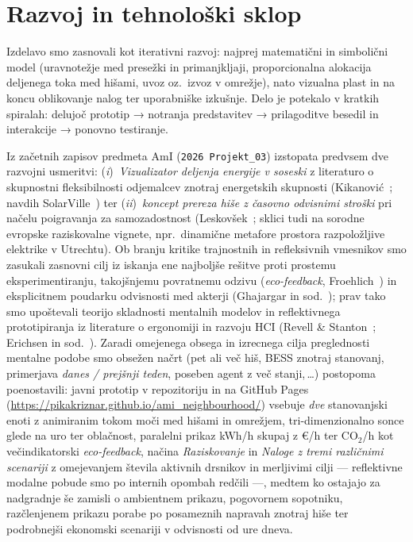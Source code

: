 \documentclass[a4paper,11pt]{article}
\begin{document}
\section*{Razvoj in tehnološki sklop}
Izdelavo smo zasnovali kot iterativni razvoj: najprej matematični in simbolični model (uravnotežje med presežki in primanjkljaji, proporcionalna alokacija deljenega toka med hišami, uvoz oz.\ izvoz v omrežje), nato vizualna plast in na koncu oblikovanje nalog ter uporabniške izkušnje. Delo je potekalo v kratkih spiralah: delujoč prototip → notranja predstavitev → prilagoditve besedil in interakcije → ponovno testiranje.

Iz začetnih zapisov predmeta AmI (\texttt{2026 Projekt\_03}) izstopata predvsem dve razvojni usmeritvi: (\emph{i})~\emph{Vizualizator deljenja energije v soseski} z literaturo o skupnostni fleksibilnosti odjemalcev znotraj energetskih skupnosti (Kikanović~\cite{kikanovic2021}; navdih SolarVille~\cite{solarville}) ter (\emph{ii})~\emph{koncept prereza hiše z časovno odvisnimi stroški} pri načelu poigravanja za samozadostnost (Leskovšek~\cite{leskovsek2022}; sklici tudi na sorodne evropske raziskovalne vignete, npr.\ dinamične metafore prostora razpoložljive elektrike v Utrechtu). Ob branju kritike trajnostnih in refleksivnih vmesnikov smo zasukali zasnovni cilj iz iskanja ene najboljše rešitve proti prostemu eksperimentiranju, takojšnjemu povratnemu odzivu (\emph{eco-feedback}, Froehlich~\cite{froehlich2009}) in eksplicitnem poudarku odvisnosti med akterji (Ghajargar in sod.~\cite{ghajargar2018}); prav tako smo upoštevali teorijo skladnosti mentalnih modelov in reflektivnega prototipiranja iz literature o ergonomiji in razvoju HCI (Revell \& Stanton~\cite{revell2014}; Erichsen in sod.~\cite{erichsen2017}). Zaradi omejenega obsega in izrecnega cilja preglednosti mentalne podobe smo obsežen načrt (pet ali več hiš, BESS znotraj stanovanj, primerjava \emph{danes / prejšnji teden}, poseben agent z več stanji,\,\ldots) postopoma poenostavili: javni prototip v repozitoriju in na GitHub Pages (\url{https://pikakriznar.github.io/ami_neighbourhood/}) vsebuje \emph{dve} stanovanjski enoti z animiranim tokom moči med hišami in omrežjem, tri-dimenzionalno sonce glede na uro ter oblačnost, paralelni prikaz kWh/h skupaj z €/h ter CO$_2$/h kot večindikatorski \emph{eco-feedback}, načina \emph{Raziskovanje} in \emph{Naloge z tremi različnimi scenariji} z omejevanjem števila aktivnih drsnikov in merljivimi cilji --- reflektivne modalne pobude smo po internih opombah redčili ---, medtem ko ostajajo za nadgradnje še zamisli o ambientnem prikazu, pogovornem sopotniku, razčlenjenem prikazu porabe po posameznih napravah znotraj hiše ter podrobnejši ekonomski scenariji v odvisnosti od ure dneva.
\end{document}
